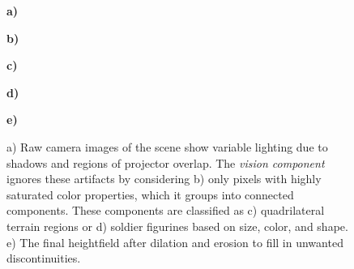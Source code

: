 \documentclass[10pt,twocolumn,letterpaper]{article}
\begin{document}
\begin{figure}[t]
\begin{center}
\begin{minipage}{\picwidth}\textcolor[rgb]{1,1,1}{\hspace{-0.05in} {\bf      a)}} \end{minipage}
\begin{minipage}{\picwidth}\textcolor[rgb]{1,1,1}{\hspace{-0.05in} {\bf      b)}} \end{minipage}
\begin{minipage}{\picwidth}\textcolor[rgb]{1,1,1}{\hspace{-0.05in} {\bf      c)}} \end{minipage}
\begin{minipage}{\picwidth}\textcolor[rgb]{1,1,1}{\hspace{-0.05in} {\bf      d)}} \end{minipage}
\begin{minipage}{\picwidth}\textcolor[rgb]{1,1,1}{\hspace{-0.05in} {\bf      e)}} \end{minipage}
\end{center}
\vspace{-0.06in}
\caption[ARmy Object Detection]{a) Raw camera images of the scene show
  variable lighting due to shadows and regions of projector overlap.
  The \emph{vision component} ignores these artifacts by considering
  b) only pixels with highly saturated color properties, which it
  groups into connected components. These components are classified as
  c) quadrilateral terrain regions or d) soldier figurines based on
  size, color, and shape.
e) The final heightfield after dilation and erosion to fill in unwanted discontinuities.}
\label{FIGURE:ARmyObjectDetection}
\vspace{-0.1in}
\end{figure}
\end{document}
